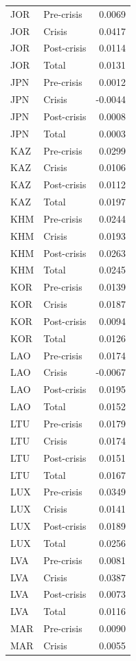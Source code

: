 \begin{longtable}[t]{llr}
JOR & Pre-crisis & 0.0069\\
JOR & Crisis & 0.0417\\
\addlinespace
JOR & Post-crisis & 0.0114\\
JOR & Total & 0.0131\\
JPN & Pre-crisis & 0.0012\\
JPN & Crisis & -0.0044\\
JPN & Post-crisis & 0.0008\\
\addlinespace
JPN & Total & 0.0003\\
KAZ & Pre-crisis & 0.0299\\
KAZ & Crisis & 0.0106\\
KAZ & Post-crisis & 0.0112\\
KAZ & Total & 0.0197\\
\addlinespace
KHM & Pre-crisis & 0.0244\\
KHM & Crisis & 0.0193\\
KHM & Post-crisis & 0.0263\\
KHM & Total & 0.0245\\
KOR & Pre-crisis & 0.0139\\
\addlinespace
KOR & Crisis & 0.0187\\
KOR & Post-crisis & 0.0094\\
KOR & Total & 0.0126\\
LAO & Pre-crisis & 0.0174\\
LAO & Crisis & -0.0067\\
\addlinespace
LAO & Post-crisis & 0.0195\\
LAO & Total & 0.0152\\
LTU & Pre-crisis & 0.0179\\
LTU & Crisis & 0.0174\\
LTU & Post-crisis & 0.0151\\
\addlinespace
LTU & Total & 0.0167\\
LUX & Pre-crisis & 0.0349\\
LUX & Crisis & 0.0141\\
LUX & Post-crisis & 0.0189\\
LUX & Total & 0.0256\\
\addlinespace
LVA & Pre-crisis & 0.0081\\
LVA & Crisis & 0.0387\\
LVA & Post-crisis & 0.0073\\
LVA & Total & 0.0116\\
MAR & Pre-crisis & 0.0090\\
\addlinespace
MAR & Crisis & 0.0055\\

\end{longtable}
